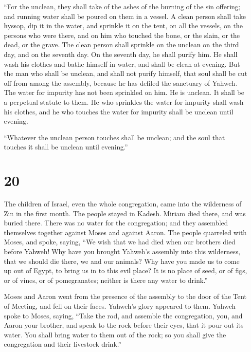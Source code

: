  ``For the unclean, they shall take of the ashes of the
burning of the sin offering; and running water shall be poured on them
in a vessel.  A clean person shall take hyssop, dip it in
the water, and sprinkle it on the tent, on all the vessels, on the
persons who were there, and on him who touched the bone, or the slain,
or the dead, or the grave.  The clean person shall sprinkle
on the unclean on the third day, and on the seventh day. On the seventh
day, he shall purify him. He shall wash his clothes and bathe himself in
water, and shall be clean at evening.  But the man who
shall be unclean, and shall not purify himself, that soul shall be cut
off from among the assembly, because he has defiled the sanctuary of
Yahweh. The water for impurity has not been sprinkled on him. He is
unclean.  It shall be a perpetual statute to them. He who
sprinkles the water for impurity shall wash his clothes, and he who
touches the water for impurity shall be unclean until evening.

 ``Whatever the unclean person touches shall be unclean;
and the soul that touches it shall be unclean until evening.''

\hypertarget{section-19}{%
\section{20}\label{section-19}}

 The children of Israel, even the whole congregation, came
into the wilderness of Zin in the first month. The people stayed in
Kadesh. Miriam died there, and was buried there.  There was
no water for the congregation; and they assembled themselves together
against Moses and against Aaron.  The people quarreled with
Moses, and spoke, saying, ``We wish that we had died when our brothers
died before Yahweh!  Why have you brought Yahweh's assembly
into this wilderness, that we should die there, we and our animals?
 Why have you made us to come up out of Egypt, to bring us
in to this evil place? It is no place of seed, or of figs, or of vines,
or of pomegranates; neither is there any water to drink.''

 Moses and Aaron went from the presence of the assembly to
the door of the Tent of Meeting, and fell on their faces. Yahweh's glory
appeared to them.  Yahweh spoke to Moses, saying,
 ``Take the rod, and assemble the congregation, you, and
Aaron your brother, and speak to the rock before their eyes, that it
pour out its water. You shall bring water to them out of the rock; so
you shall give the congregation and their livestock drink.''

